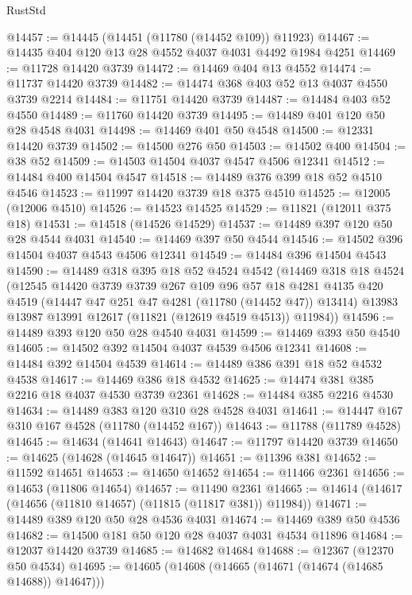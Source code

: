 \begin{lexlean}{RustStd}
\begin{coremodule}
@14457 := @14445 (@14451 (@11780 (@14452 @109)) @11923)
@14467 := @14435 @404 @120 @13 @28 @4552 @4037 @4031 @4492 @1984 @4251
@14469 := @11728 @14420 @3739
@14472 := @14469 @404 @13 @4552
@14474 := @11737 @14420 @3739
@14482 := @14474 @368 @403 @52 @13 @4037 @4550 @3739 @2214
@14484 := @11751 @14420 @3739
@14487 := @14484 @403 @52 @4550
@14489 := @11760 @14420 @3739
@14495 := @14489 @401 @120 @50 @28 @4548 @4031
@14498 := @14469 @401 @50 @4548
@14500 := @12331 @14420 @3739
@14502 := @14500 @276 @50
@14503 := @14502 @400
@14504 := @38 @52
@14509 := @14503 @14504 @4037 @4547 @4506 @12341
@14512 := @14484 @400 @14504 @4547
@14518 := @14489 @376 @399 @18 @52 @4510 @4546
@14523 := @11997 @14420 @3739 @18 @375 @4510
@14525 := @12005 (@12006 @4510)
@14526 := @14523 @14525
@14529 := @11821 (@12011 @375 @18)
@14531 := @14518 (@14526 @14529)
@14537 := @14489 @397 @120 @50 @28 @4544 @4031
@14540 := @14469 @397 @50 @4544
@14546 := @14502 @396 @14504 @4037 @4543 @4506 @12341
@14549 := @14484 @396 @14504 @4543
@14590 := @14489
    @318
    @395
    @18
    @52
    @4524
    @4542
    (@14469
      @318
      @18
      @4524
      (@12545
        @14420
        @3739
        @3739
        @267
        @109
        @96
        @57
        @18
        @4281
        @4135
        @420
        @4519
        (@14447 @47 @251 @47 @4281 (@11780 (@14452 @47)) @13414)
        @13983
        @13987
        @13991
        @12617
        (@11821 (@12619 @4519 @4513))
        @11984))
@14596 := @14489 @393 @120 @50 @28 @4540 @4031
@14599 := @14469 @393 @50 @4540
@14605 := @14502 @392 @14504 @4037 @4539 @4506 @12341
@14608 := @14484 @392 @14504 @4539
@14614 := @14489 @386 @391 @18 @52 @4532 @4538
@14617 := @14469 @386 @18 @4532
@14625 := @14474 @381 @385 @2216 @18 @4037 @4530 @3739 @2361
@14628 := @14484 @385 @2216 @4530
@14634 := @14489 @383 @120 @310 @28 @4528 @4031
@14641 := @14447 @167 @310 @167 @4528 (@11780 (@14452 @167))
@14643 := @11788 (@11789 @4528)
@14645 := @14634 (@14641 @14643)
@14647 := @11797 @14420 @3739
@14650 := @14625 (@14628 (@14645 @14647))
@14651 := @11396 @381
@14652 := @11592 @14651
@14653 := @14650 @14652
@14654 := @11466 @2361
@14656 := @14653 (@11806 @14654)
@14657 := @11490 @2361
@14665 := @14614 (@14617 (@14656 (@11810 @14657) (@11815 (@11817 @381)) @11984))
@14671 := @14489 @389 @120 @50 @28 @4536 @4031
@14674 := @14469 @389 @50 @4536
@14682 := @14500 @181 @50 @120 @28 @4037 @4031 @4534 @11896
@14684 := @12037 @14420 @3739
@14685 := @14682 @14684
@14688 := @12367 (@12370 @50 @4534)
@14695 := @14605 (@14608 (@14665 (@14671 (@14674 (@14685 @14688)) @14647)))

\end{coremodule}
\end{lexlean}
